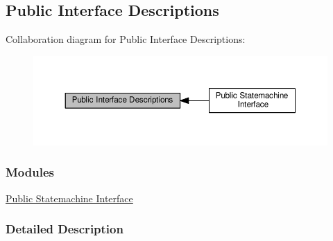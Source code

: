 \hypertarget{group___public_interfaces}{}\subsection{Public Interface Descriptions}
\label{group___public_interfaces}
Collaboration diagram for Public Interface Descriptions\+:\nopagebreak
\begin{figure}[H]
\begin{center}
\leavevmode
\includegraphics[width=350pt]{group___public_interfaces}
\end{center}
\end{figure}
\subsubsection*{Modules}
\begin{DoxyCompactItemize}
\item 
\hyperlink{group___sm_interface}{Public Statemachine Interface}
\end{DoxyCompactItemize}


\subsubsection{Detailed Description}

